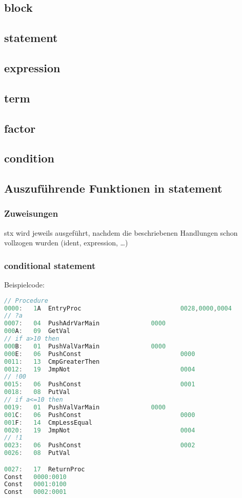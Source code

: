 \subsection{block}
\label{6-block}
\subsection{statement}
\subsection{expression}
\subsection{term}
\subsection{factor}
\subsection{condition}

\subsection{Auszuführende Funktionen in statement}
\subsubsection{Zuweisungen}
stx wird jeweils ausgeführt, nachdem die beschriebenen Handlungen schon vollzogen wurden (ident, expression, …)
\subsubsection{conditional statement}
Beispielcode:
\begin{lstlisting}[language=C]
// Procedure
0000:	1A	EntryProc							0028,0000,0004
// ?a
0007:	04	PushAdrVarMain				0000
000A:	09	GetVal
// if a>10 then
000B:	01	PushValVarMain				0000
000E:	06	PushConst							0000
0011:	13	CmpGreaterThen
0012:	19	JmpNot								0004
// !00
0015:	06	PushConst							0001
0018:	08	PutVal
// if a<=10 then
0019:	01	PushValVarMain				0000
001C:	06	PushConst							0000
001F:	14	CmpLessEqual
0020:	19	JmpNot								0004
// !1
0023:	06	PushConst							0002
0026:	08	PutVal

0027:	17	ReturnProc
Const	0000:0010
Const	0001:0100
Const	0002:0001
\end{lstlisting}
